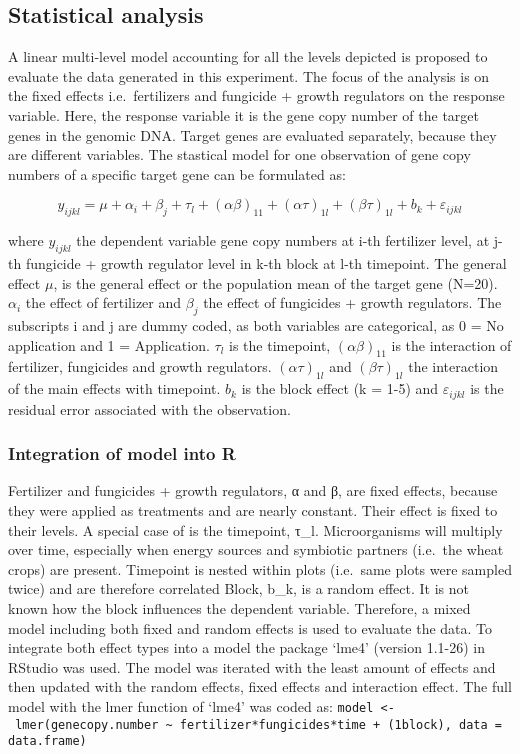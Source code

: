 \documentclass[twoside,12pt,final]{ucthesis-CA2012}
\begin{document}
\begin{ucmainmatter}
\hypertarget{statistical-analysis}{%
\subsection{Statistical analysis}\label{statistical-analysis}}

A linear multi-level model accounting for all the levels depicted is proposed to evaluate the data generated in this experiment. The focus of the analysis is on the fixed effects i.e.~fertilizers and fungicide + growth regulators on the response variable. Here, the response variable it is the gene copy number of the target genes in the genomic DNA. Target genes are evaluated separately, because they are different variables. The stastical model for one observation of gene copy numbers of a specific target gene can be formulated as:

\[ y_{ijkl}=\mu + \alpha_i+\beta_j+\tau_l+(αβ)_{11}+ (ατ)_{1l}+ (βτ)_{1l}+b_k+ε_{ijkl}\]

where \(y_{ijkl}\) the dependent variable gene copy numbers at i-th fertilizer level, at j-th fungicide + growth regulator level in k-th block at l-th timepoint. The general effect \(\mu\), is the general effect or the population mean of the target gene (N=20). \(\alpha_i\) the effect of fertilizer and \(\beta_j\) the effect of fungicides + growth regulators. The subscripts i and j are dummy coded, as both variables are categorical, as 0 = No application and 1 = Application. \(\tau_l\) is the timepoint, \((\alpha \beta)_{11}\) is the interaction of fertilizer, fungicides and growth regulators. \((\alpha \tau)_{1l}\) and \((\beta \tau)_{1l}\) the interaction of the main effects with timepoint. \(b_k\) is the block effect (k = 1-5) and \(ε_{ijkl}\) is the residual error associated with the observation.

\hypertarget{integration-of-model-into-r}{%
\subsubsection{Integration of model into R}\label{integration-of-model-into-r}}

Fertilizer and fungicides + growth regulators, α and β, are fixed effects, because they were applied as treatments and are nearly constant. Their effect is fixed to their levels. A special case of is the timepoint, τ\_l. Microorganisms will multiply over time, especially when energy sources and symbiotic partners (i.e.~the wheat crops) are present. Timepoint is nested within plots (i.e.~same plots were sampled twice) and are therefore correlated
Block, b\_k, is a random effect. It is not known how the block influences the dependent variable. Therefore, a mixed model including both fixed and random effects is used to evaluate the data.
To integrate both effect types into a model the package `lme4' (version 1.1-26) in RStudio was used. The model was iterated with the least amount of effects and then updated with the random effects, fixed effects and interaction effect.
The full model with the lmer function of `lme4' was coded as:
\texttt{model\ \textless{}-\ lmer(genecopy.number\ \textasciitilde{}\ fertilizer*fungicides*time\ +\ (1\textbar{}block),\ data\ =\ data.frame)}


\end{ucmainmatter}
\end{document}
